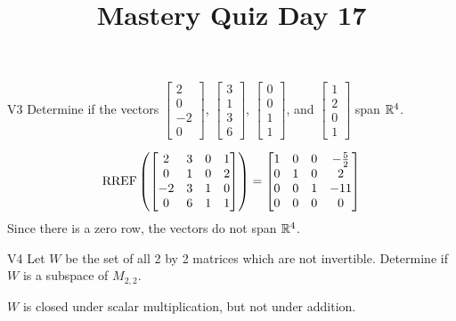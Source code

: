 \documentclass{sbgLAquiz}
\title{Mastery Quiz Day 17 }
\begin{document}
\begin{problem}{V3} 
Determine if the vectors $\begin{bmatrix} 2 \\ 0 \\ -2 \\ 0 \end{bmatrix}$, $\begin{bmatrix} 3 \\ 1 \\ 3 \\ 6 \end{bmatrix}$, $\begin{bmatrix} 0 \\ 0 \\ 1 \\ 1 \end{bmatrix}$, and $\begin{bmatrix}1 \\ 2 \\ 0 \\ 1 \end{bmatrix}$ span $\mathbb{R}^4$.
\end{problem}
\begin{solution}
$$\operatorname{RREF}\left( \begin{bmatrix} 2 & 3 & 0 & 1 \\ 0 & 1 & 0 & 2 \\ -2 & 3 & 1 & 0 \\ 0 & 6 & 1 & 1\end{bmatrix} \right) = \begin{bmatrix}1 & 0 & 0 & -\frac{5}{2} \\ 0 & 1 & 0 & 2 \\ 0 & 0 & 1 & -11\\ 0 & 0 & 0 & 0  \end{bmatrix} $$
Since there is a zero row, the vectors do not span $\mathbb{R}^4$.
\end{solution}

\begin{problem}{V4} 
Let $W$ be the set of all 2 by 2 matrices which are not invertible.  Determine if $W$ is a subspace of $M_{2,2}$.
\end{problem}
\begin{solution}
$W$ is closed under scalar multiplication, but not under addition. 
\end{solution}
\end{document}
